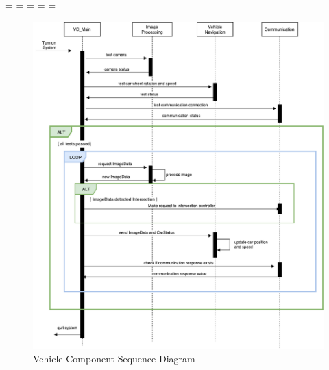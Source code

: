 \documentclass [10pt]{article}
\begin{document}
\begin{landscape}
\end{landscape}
\endgroup


\newpage
\paperwidth=\pdfpageheight
\paperheight=\pdfpagewidth
\pdfpageheight=\paperheight
\pdfpagewidth=\paperwidth
\headwidth=\textwidth


\begin {figure}[h!]
\centering
\caption{Vehicle Component Sequence Diagram} \vspace{4mm}
\hspace*{-1.4cm}
\includegraphics [scale = .68, trim={0 0 0 0},clip] {figures/carSequenceDiag.pdf}

\end {figure}
\end{document}
